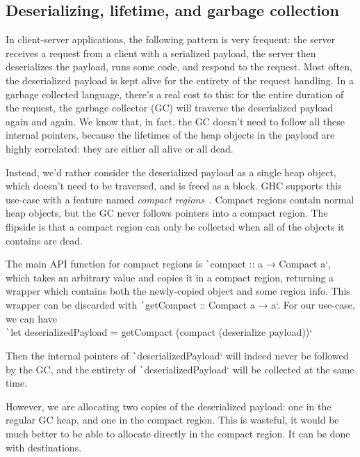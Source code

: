 \documentclass[english]{jflart}
\begin{document}
\subsection{Deserializing, lifetime, and garbage collection}\label{ssec:parser-sexpr}

In client-server applications, the following pattern is very frequent: the server receives a request from a client with a serialized payload, the server then deserializes the payload, runs some code, and respond to the request. Most often, the deserialized payload is kept alive for the entirety of the request handling. In a garbage collected language, there's a real cost to this: for the entire duration of the request, the garbage collector (GC) will traverse the deserialized payload again and again. We know that, in fact, the GC doesn't need to follow all these internal pointers, because the lifetimes of the heap objects in the payload are highly correlated: they are either all alive or all dead.

Instead, we'd rather consider the deserialized payload as a single heap object, which doesn't need to be traversed, and is freed as a block. GHC supports this use-case with a feature named \emph{compact regions}~\cite{yang_efficient_2015}. Compact regions contain normal heap objects, but the GC never follows pointers into a compact region. The flipside is that a compact region can only be collected when all of the objects it contains are dead.

The main API function for compact regions is \texttt`compact :: a → Compact a`, which takes an arbitrary value and copies it in a compact region, returning a wrapper which contains both the newly-copied object and some region info. This wrapper can be discarded with \texttt`getCompact :: Compact a → a`. For our use-case, we can have\\
\texttt`let deserializedPayload = getCompact (compact (deserialize payload))`

Then the internal pointers of \texttt`deserializedPayload` will indeed never be followed by the GC, and the entirety of \texttt`deserializedPayload` will be collected at the same time.

However, we are allocating two copies of the deserialized payload: one in the regular GC heap, and one in the compact region. This is wasteful, it would be much better to be able to allocate directly in the compact region. It can be done with destinations.
\end{document}
